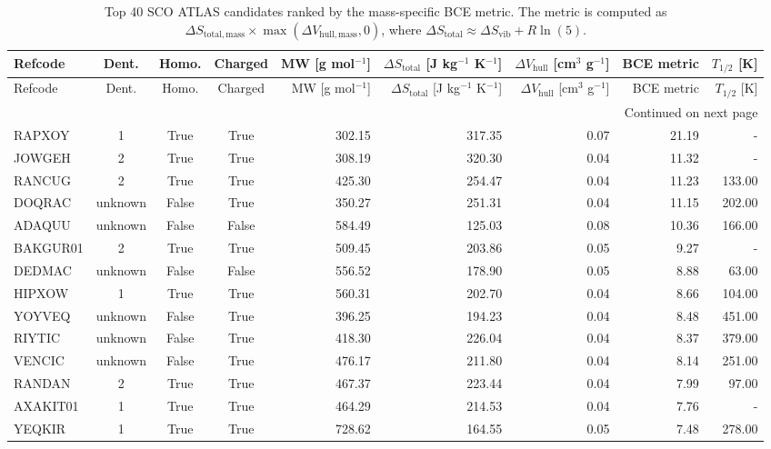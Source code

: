 \begin{scriptsize}
\begin{longtable}{l c c c r r r r r}
\caption{Top 40 SCO ATLAS candidates ranked by the mass-specific BCE metric. The metric is computed as $\Delta S_{\mathrm{total,mass}} \times \max(\Delta V_{\mathrm{hull,mass}},0)$, where $\Delta S_{\mathrm{total}} \approx \Delta S_{\mathrm{vib}} + R\ln(5)$.}
\label{tab:bce_top40_candidates}\\
\toprule
Refcode & Dent. & Homo. & Charged & MW [g mol$^{-1}$] & $\Delta S_{\mathrm{total}}$ [J kg$^{-1}$ K$^{-1}$] & $\Delta V_{\mathrm{hull}}$ [cm$^3$ g$^{-1}$] & BCE metric & $T_{1/2}$ [K] \\
\midrule
\endfirsthead
\toprule
Refcode & Dent. & Homo. & Charged & MW [g mol$^{-1}$] & $\Delta S_{\mathrm{total}}$ [J kg$^{-1}$ K$^{-1}$] & $\Delta V_{\mathrm{hull}}$ [cm$^3$ g$^{-1}$] & BCE metric & $T_{1/2}$ [K] \\
\midrule
\endhead
\midrule
\multicolumn{9}{r}{Continued on next page} \\
\midrule
\endfoot
\bottomrule
\endlastfoot
RAPXOY & 1 & True & True & 302.15 & 317.35 & 0.07 & 21.19 & - \\
JOWGEH & 2 & True & True & 308.19 & 320.30 & 0.04 & 11.32 & - \\
RANCUG & 2 & True & True & 425.30 & 254.47 & 0.04 & 11.23 & 133.00 \\
DOQRAC & unknown & False & True & 350.27 & 251.31 & 0.04 & 11.15 & 202.00 \\
ADAQUU & unknown & False & False & 584.49 & 125.03 & 0.08 & 10.36 & 166.00 \\
BAKGUR01 & 2 & True & True & 509.45 & 203.86 & 0.05 & 9.27 & - \\
DEDMAC & unknown & False & False & 556.52 & 178.90 & 0.05 & 8.88 & 63.00 \\
HIPXOW & 1 & True & True & 560.31 & 202.70 & 0.04 & 8.66 & 104.00 \\
YOYVEQ & unknown & False & True & 396.25 & 194.23 & 0.04 & 8.48 & 451.00 \\
RIYTIC & unknown & False & True & 418.30 & 226.04 & 0.04 & 8.37 & 379.00 \\
VENCIC & unknown & False & True & 476.17 & 211.80 & 0.04 & 8.14 & 251.00 \\
RANDAN & 2 & True & True & 467.37 & 223.44 & 0.04 & 7.99 & 97.00 \\
AXAKIT01 & 1 & True & True & 464.29 & 214.53 & 0.04 & 7.76 & - \\
YEQKIR & 1 & True & True & 728.62 & 164.55 & 0.05 & 7.48 & 278.00 \\

\end{longtable}
\end{scriptsize}
